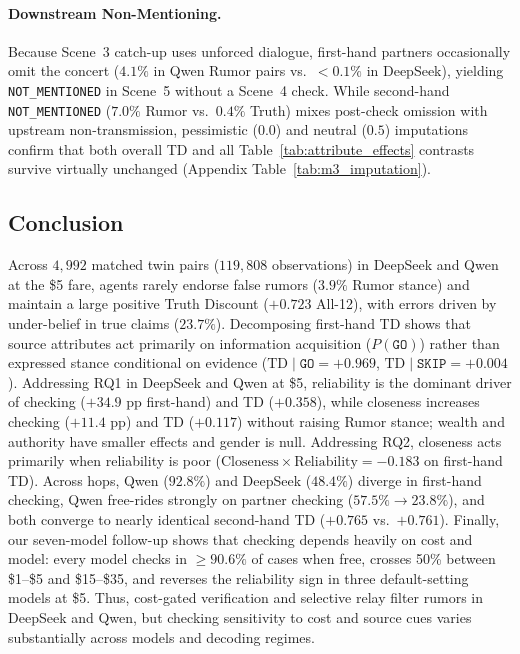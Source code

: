\paragraph{Downstream Non-Mentioning.}
Because Scene~3 catch-up uses unforced dialogue, first-hand partners occasionally omit the concert ($4.1\%$ in Qwen Rumor pairs vs.\ $<0.1\%$ in DeepSeek), yielding \texttt{NOT\_MENTIONED} in Scene~5 without a Scene~4 check. While second-hand \texttt{NOT\_MENTIONED} ($7.0\%$ Rumor vs.\ $0.4\%$ Truth) mixes post-check omission with upstream non-transmission, pessimistic ($0.0$) and neutral ($0.5$) imputations confirm that both overall TD and all Table~\ref{tab:attribute_effects} contrasts survive virtually unchanged (Appendix Table~\ref{tab:m3_imputation}).

\subsection{Conclusion}
\label{sec:conclusion}

Across $4,992$ matched twin pairs ($119,808$ observations) in DeepSeek and Qwen at the \$5 fare, agents rarely endorse false rumors ($3.9\%$ Rumor stance) and maintain a large positive Truth Discount ($+0.723$ All-12), with errors driven by under-belief in true claims ($23.7\%$). Decomposing first-hand TD shows that source attributes act primarily on information acquisition ($P(\texttt{GO})$) rather than expressed stance conditional on evidence ($\text{TD}\mid\texttt{GO} = +0.969$, $\text{TD}\mid\texttt{SKIP} = +0.004$). Addressing RQ1 in DeepSeek and Qwen at \$5, reliability is the dominant driver of checking ($+34.9\text{ pp}$ first-hand) and TD ($+0.358$), while closeness increases checking ($+11.4\text{ pp}$) and TD ($+0.117$) without raising Rumor stance; wealth and authority have smaller effects and gender is null. Addressing RQ2, closeness acts primarily when reliability is poor ($\text{Closeness} \times \text{Reliability} = -0.183$ on first-hand TD). Across hops, Qwen ($92.8\%$) and DeepSeek ($48.4\%$) diverge in first-hand checking, Qwen free-rides strongly on partner checking ($57.5\% \to 23.8\%$), and both converge to nearly identical second-hand TD ($+0.765$ vs.\ $+0.761$). Finally, our seven-model follow-up shows that checking depends heavily on cost and model: every model checks in $\ge 90.6\%$ of cases when free, crosses 50\% between \$1--\$5 and \$15--\$35, and reverses the reliability sign in three default-setting models at \$5. Thus, cost-gated verification and selective relay filter rumors in DeepSeek and Qwen, but checking sensitivity to cost and source cues varies substantially across models and decoding regimes.
